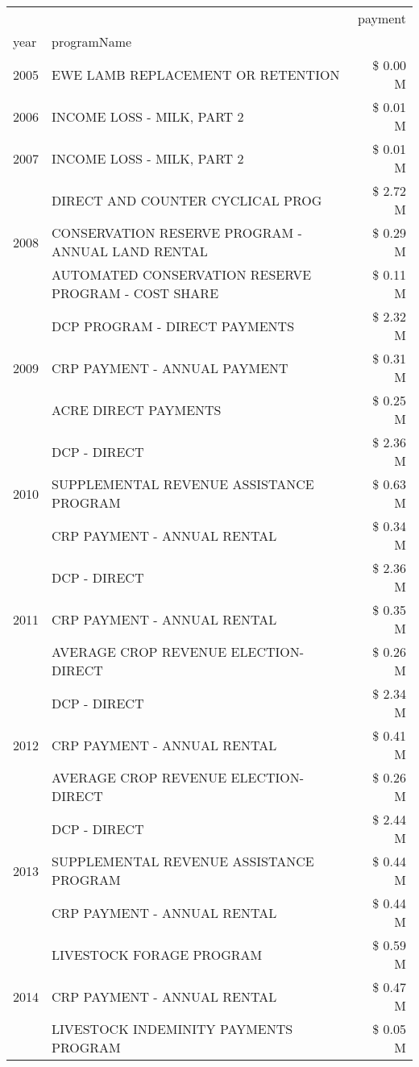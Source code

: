 \begin{tabular}{llr}
\toprule
 &  & payment \\
year & programName &  \\
\midrule
2005 & EWE LAMB REPLACEMENT OR RETENTION & \$ 0.00 M \\
\cline{1-3}
2006 & INCOME LOSS - MILK, PART 2 & \$ 0.01 M \\
\cline{1-3}
2007 & INCOME LOSS - MILK, PART 2 & \$ 0.01 M \\
\cline{1-3}
\multirow[t]{3}{*}{2008} & DIRECT AND COUNTER CYCLICAL PROG & \$ 2.72 M \\
 & CONSERVATION RESERVE PROGRAM - ANNUAL LAND RENTAL & \$ 0.29 M \\
 & AUTOMATED CONSERVATION RESERVE PROGRAM - COST SHARE & \$ 0.11 M \\
\cline{1-3}
\multirow[t]{3}{*}{2009} & DCP PROGRAM - DIRECT PAYMENTS & \$ 2.32 M \\
 & CRP PAYMENT - ANNUAL PAYMENT & \$ 0.31 M \\
 & ACRE DIRECT PAYMENTS & \$ 0.25 M \\
\cline{1-3}
\multirow[t]{3}{*}{2010} & DCP - DIRECT & \$ 2.36 M \\
 & SUPPLEMENTAL REVENUE ASSISTANCE PROGRAM & \$ 0.63 M \\
 & CRP PAYMENT - ANNUAL RENTAL & \$ 0.34 M \\
\cline{1-3}
\multirow[t]{3}{*}{2011} & DCP - DIRECT & \$ 2.36 M \\
 & CRP PAYMENT - ANNUAL RENTAL & \$ 0.35 M \\
 & AVERAGE CROP REVENUE ELECTION-DIRECT & \$ 0.26 M \\
\cline{1-3}
\multirow[t]{3}{*}{2012} & DCP - DIRECT & \$ 2.34 M \\
 & CRP PAYMENT - ANNUAL RENTAL & \$ 0.41 M \\
 & AVERAGE CROP REVENUE ELECTION-DIRECT & \$ 0.26 M \\
\cline{1-3}
\multirow[t]{3}{*}{2013} & DCP - DIRECT & \$ 2.44 M \\
 & SUPPLEMENTAL REVENUE ASSISTANCE PROGRAM & \$ 0.44 M \\
 & CRP PAYMENT - ANNUAL RENTAL & \$ 0.44 M \\
\cline{1-3}
\multirow[t]{3}{*}{2014} & LIVESTOCK FORAGE PROGRAM & \$ 0.59 M \\
 & CRP PAYMENT - ANNUAL RENTAL & \$ 0.47 M \\
 & LIVESTOCK INDEMINITY PAYMENTS PROGRAM & \$ 0.05 M \\
\cline{1-3}

\end{tabular}
